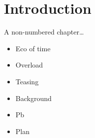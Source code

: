 \chapter*{Introduction}
A non-numbered chapter\dots

\begin{itemize}
  \item Eco of time
  \item Overload
  \item Teasing
  \item Background
  \item Pb
  \item Plan
\end{itemize}